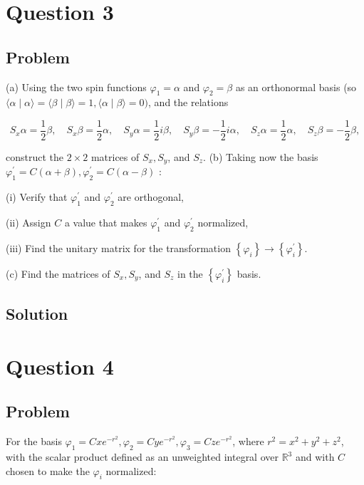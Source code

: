 \documentclass[12pt]{article}
\begin{document}
\newpage
\section{Question 3}

\subsection{Problem}

(a) Using the two spin functions \(\varphi_1=\alpha\) and \(\varphi_2=\beta\) as an orthonormal basis (so \(\langle\alpha \mid \alpha\rangle=\langle\beta \mid \beta\rangle=1,\langle\alpha \mid \beta\rangle=0)\), and the relations

\[
    S_x \alpha=\frac{1}{2} \beta, \quad S_x \beta=\frac{1}{2} \alpha, \quad S_y \alpha=\frac{1}{2} i \beta, \quad S_y \beta=-\frac{1}{2} i \alpha, \quad S_z \alpha=\frac{1}{2} \alpha, \quad S_z \beta=-\frac{1}{2} \beta,
\]

construct the \(2 \times 2\) matrices of \(S_x, S_y\), and \(S_z\).
(b) Taking now the basis \(\varphi_1^{\prime}=C(\alpha+\beta), \varphi_2^{\prime}=C(\alpha-\beta)\) :

(i) Verify that \(\varphi_1^{\prime}\) and \(\varphi_2^{\prime}\) are orthogonal,

(ii) Assign \(C\) a value that makes \(\varphi_1^{\prime}\) and \(\varphi_2^{\prime}\) normalized,

(iii) Find the unitary matrix for the transformation \(\left\{\varphi_i\right\} \rightarrow\left\{\varphi_i^{\prime}\right\}\).

(c) Find the matrices of \(S_x, S_y\), and \(S_z\) in the \(\left\{\varphi_i^{\prime}\right\}\) basis.

\subsection{Solution}


\newpage
\section{Question 4}

\subsection{Problem}

For the basis \(\varphi_1=C x e^{-r^2}, \varphi_2=C y e^{-r^2}, \varphi_3=C z e^{-r^2}\), where \(r^2=x^2+y^2+z^2\), with the scalar product defined as an unweighted integral over \(\mathbb{R}^3\) and with \(C\) chosen to make the \(\varphi_i\) normalized:
\end{document}
